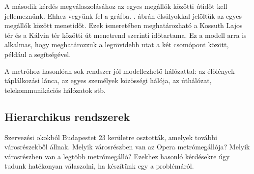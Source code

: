 
	A második kérdés megválaszolásához az egyes megállók közötti útidőt kell jellemeznünk. Ehhez vegyünk fel  a gráfba. . ábrán élsúlyokkal jelöltük az egyes megállók között menetidőt. Ezek ismeretében meghatározható a Kossuth Lajos tér és a Kálvin tér közötti út menetrend szerinti időtartama. Ez a modell arra is alkalmas, hogy meghatározzuk a legrövidebb utat a két csomópont között, például a  segítségével.
		
	
	A metróhoz hasonlóan sok rendszer jól modellezhető hálózattal: az élőlények táplálkozási lánca, az egyes személyek közösségi hálója, az úthálózat,  telekommunikációs hálózatok stb.
	

\subsection{Hierarchikus rendszerek}

\begin{pelda}
	Szervezési okokból Budapestet 23 kerületre osztották, amelyek további városrészekből állnak. %
	Melyik városrészben van az Opera metrómegállója? Melyik városrészben van a legtöbb metrómegálló? Ezekhez hasonló kérdésekre úgy tudunk hatékonyan válaszolni, ha készítünk egy  a problémáról.
\end{pelda}



